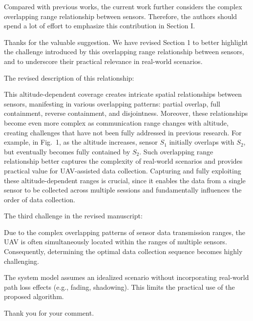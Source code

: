 \reviewer

\begin{revcomment}
	Compared with previous works, the current work further considers the complex overlapping range relationship between sensors. Therefore, the authors should spend a lot of effort to emphasize this contribution in Section I.
\end{revcomment}
\begin{revresponse}
	Thanks for the valuable suggestion.
	We have revised Section 1 to better highlight the challenge introduced by this overlapping range relationship between sensors, and to underscore their practical relevance in real-world scenarios.

	The revised description of this relationship:
	\begin{changes}
		This altitude-dependent coverage creates intricate spatial relationships between sensors, manifesting in various overlapping patterns: partial overlap, full containment, reverse containment, and disjointness.
		Moreover, these relationships become even more complex as communication range changes with altitude, creating challenges that have not been fully addressed in previous research.
		For example, in Fig.~1, as the altitude increases, sensor $S_1$ initially overlaps with $S_2$, but eventually becomes fully contained by $S_2$.
		Such overlapping range relationship better captures the complexity of real-world scenarios and provides practical value for UAV-assisted data collection.
		Capturing and fully exploiting these altitude-dependent ranges is crucial, since it enables the data from a single sensor to be collected across multiple sessions and fundamentally influences the order of data collection.
	\end{changes}
	The third challenge in the revised manuscript:
	\begin{changes}
		Due to the complex overlapping patterns of sensor data transmission ranges, the UAV is often simultaneously located within the ranges of multiple sensors. Consequently, determining the optimal data collection sequence becomes highly challenging.
	\end{changes}
\end{revresponse}

\begin{revcomment}
	The system model assumes an idealized scenario without incorporating real-world path loss effects (e.g., fading, shadowing). This limits the practical use of the proposed algorithm.
\end{revcomment}
\begin{revresponse} %
	Thank you for your comment.
\end{revresponse}

